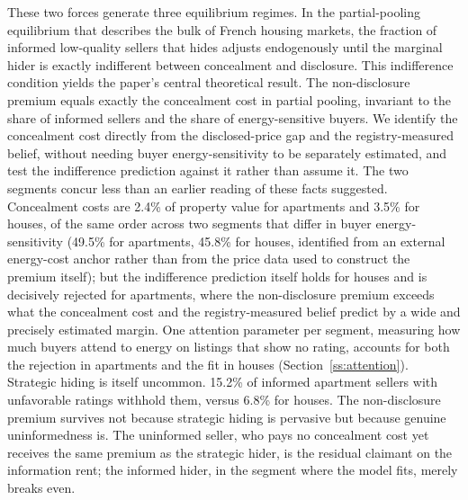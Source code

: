 \documentclass[10pt,letterpaper]{bp-template-concise}
\begin{document}
These two forces generate three equilibrium regimes. In the partial-pooling equilibrium that describes the bulk of French housing markets, the fraction of informed low-quality sellers that hides adjusts endogenously until the marginal hider is exactly indifferent between concealment and disclosure. This indifference condition yields the paper's central theoretical result. The non-disclosure premium equals exactly the concealment cost in partial pooling, invariant to the share of informed sellers and the share of energy-sensitive buyers. We identify the concealment cost directly from the disclosed-price gap and the registry-measured belief, without needing buyer energy-sensitivity to be separately estimated, and test the indifference prediction against it rather than assume it. The two segments concur less than an earlier reading of these facts suggested. Concealment costs are 2.4\% of property value for apartments and 3.5\% for houses, of the same order across two segments that differ in buyer energy-sensitivity (49.5\% for apartments, 45.8\% for houses, identified from an external energy-cost anchor rather than from the price data used to construct the premium itself); but the indifference prediction itself holds for houses and is decisively rejected for apartments, where the non-disclosure premium exceeds what the concealment cost and the registry-measured belief predict by a wide and precisely estimated margin. One attention parameter per segment, measuring how much buyers attend to energy on listings that show no rating, accounts for both the rejection in apartments and the fit in houses (Section~\ref{ss:attention}). %
Strategic hiding is itself uncommon. 15.2\% of informed apartment sellers with unfavorable ratings withhold them, versus 6.8\% for houses. The non-disclosure premium survives not because strategic hiding is pervasive but because genuine uninformedness is. The uninformed seller, who pays no concealment cost yet receives the same premium as the strategic hider, is the residual claimant on the information rent; the informed hider, in the segment where the model fits, merely breaks even.
\end{document}
